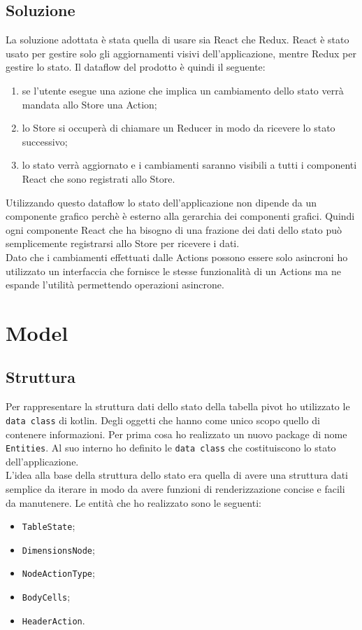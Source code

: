 \subsection{Soluzione}
La soluzione adottata è stata quella di usare sia React che Redux. React è stato usato per gestire solo gli aggiornamenti visivi dell'applicazione, mentre Redux per gestire lo stato. Il dataflow del prodotto è quindi il seguente:
\begin{enumerate}
	\item se l'utente esegue una azione che implica un cambiamento dello stato verrà mandata allo Store una Action;
	\item lo Store si occuperà di chiamare un Reducer in modo da ricevere lo stato successivo;
	\item lo stato verrà aggiornato e i cambiamenti saranno visibili a tutti i componenti React che sono registrati allo Store.
\end{enumerate}
Utilizzando questo dataflow lo stato dell'applicazione non dipende da un componente grafico perchè è esterno alla gerarchia dei componenti grafici. Quindi ogni componente React che ha bisogno di una frazione dei dati dello stato può semplicemente registrarsi allo Store per ricevere i dati. \\
Dato che i cambiamenti effettuati dalle Actions possono essere solo asincroni ho utilizzato un interfaccia che fornisce le stesse funzionalità di un Actions ma ne espande l'utilità permettendo operazioni asincrone.


\section{Model}
\subsection{Struttura}
Per rappresentare la struttura dati dello stato della tabella pivot ho utilizzato le \verb|data class| di kotlin. Degli oggetti che hanno come unico scopo quello di contenere informazioni. Per prima cosa ho realizzato un nuovo package di nome \verb|Entities|. Al suo interno ho definito le \verb|data class| che costituiscono lo stato dell'applicazione. \\
L'idea alla base della struttura dello stato era quella di avere una struttura dati semplice da iterare in modo da avere funzioni di renderizzazione concise e facili da manutenere. Le entità che ho realizzato sono le seguenti:
\begin{itemize}
	\item \verb|TableState|;
	\item \verb|DimensionsNode|;
	\item \verb|NodeActionType|;
	\item \verb|BodyCells|;
	\item \verb|HeaderAction|.
\end{itemize}

